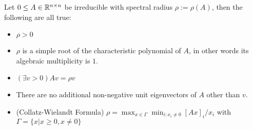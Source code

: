 \begin{thm}
\label{Ax:thm:perron2}

Let $0 \leq A \in \mathbb{R}^{n \times n}$ be irreducible with spectral radius $\rho := \rho(A)$,
then the following are all true:
\begin{itemize}
\item{} $\rho \gt 0$
\item{} $\rho$ is a simple root of the characteristic polynomial of $A$,
in other words its algebraic multiplicity is $1$.
\item{} $(\exists v > 0) Av=\rho v$
\item{} There are no additional non-negative unit eigenvectors of $A$ other than
$v$. 
\item{(Collatz-Wielandt Formula)} $\rho = \max_{x \in \Gamma} \min_{i : x_i \neq 0} [Ax]_i / x_i$
with $\Gamma = \{x | x \geq 0, x \neq 0\}$
\end{itemize}
\end{thm}


